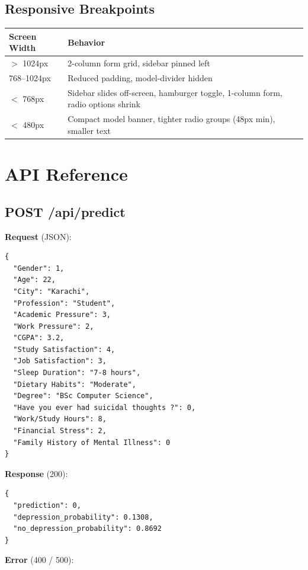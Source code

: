 \documentclass[11pt,a4paper]{article}
\begin{document}
\subsection{Responsive Breakpoints}

\begin{tabularx}{\textwidth}{l X}
\hline
\textbf{Screen Width} & \textbf{Behavior} \\
\hline
$>$ 1024px & 2-column form grid, sidebar pinned left \\
768--1024px & Reduced padding, model-divider hidden \\
$<$ 768px & Sidebar slides off-screen, hamburger toggle, 1-column form, radio options shrink \\
$<$ 480px & Compact model banner, tighter radio groups (48px min), smaller text \\
\hline
\end{tabularx}

\section{API Reference}

\subsection{POST /api/predict}

\textbf{Request} (JSON):

\begin{lstlisting}[style=py]
{
  "Gender": 1,
  "Age": 22,
  "City": "Karachi",
  "Profession": "Student",
  "Academic Pressure": 3,
  "Work Pressure": 2,
  "CGPA": 3.2,
  "Study Satisfaction": 4,
  "Job Satisfaction": 3,
  "Sleep Duration": "7-8 hours",
  "Dietary Habits": "Moderate",
  "Degree": "BSc Computer Science",
  "Have you ever had suicidal thoughts ?": 0,
  "Work/Study Hours": 8,
  "Financial Stress": 2,
  "Family History of Mental Illness": 0
}
\end{lstlisting}

\textbf{Response} (200):

\begin{lstlisting}[style=py]
{
  "prediction": 0,
  "depression_probability": 0.1308,
  "no_depression_probability": 0.8692
}
\end{lstlisting}

\textbf{Error} (400 / 500):
\end{document}
